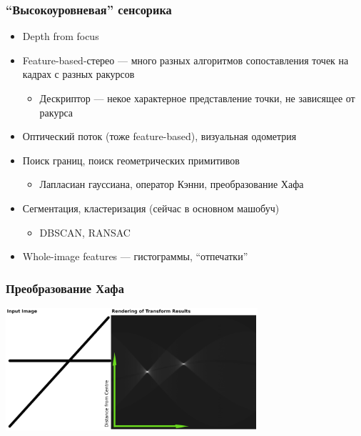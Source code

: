 \documentclass{../../slides-style}
\begin{document}
    \begin{frame}
        \frametitle{\enquote{Высокоуровневая} сенсорика}
        \begin{itemize}
            \item Depth from focus
            \item Feature-based-стерео --- много разных алгоритмов сопоставления точек на кадрах с разных ракурсов
            \begin{itemize}
                \item Дескриптор --- некое характерное представление точки, не зависящее от ракурса
            \end{itemize}
            \item Оптический поток (тоже feature-based), визуальная одометрия
            \item Поиск границ, поиск геометрических примитивов
            \begin{itemize}
                \item Лапласиан гауссиана, оператор Кэнни, преобразование Хафа
            \end{itemize}
            \item Сегментация, кластеризация (сейчас в основном машобуч)
            \begin{itemize}
                \item DBSCAN, RANSAC
            \end{itemize}
            \item Whole-image features --- гистограммы, \enquote{отпечатки}
        \end{itemize}
    \end{frame}

    \begin{frame}
        \frametitle{Преобразование Хафа}
        \begin{center}
            \includegraphics[width=0.7\textwidth]{houghTransform.png}
        \end{center}
    \end{frame}
\end{document}
